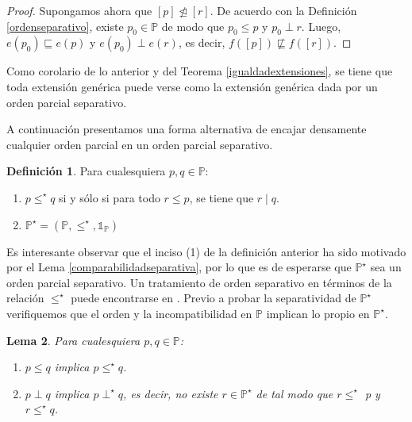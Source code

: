 \documentclass[11pt]{unam_tesis1}
\theoremstyle{MyThmStyle}
\theoremstyle{definition}
\newtheorem{definition}{Definici\'on}[chapter]
\theoremstyle{plain}
\newtheorem{lemma}[definition]{Lema}
\theoremstyle{remark}
\newtheorem*{remark}{Observaci\'on}
\let\leq\leqslant
\begin{document}
\begin{proof}
Supongamos ahora que $[p]\ntrianglelefteq [r]$. De acuerdo con la Definici\'on \ref{ordenseparativo}, existe $p_0\in \mathbb P$ de modo que $p_0\leq p$ y $p_0\perp r$. Luego, $e(p_0)\sqsubseteq e(p)$ y $e(p_0)\perp e(r)$, es decir, $f([p])\not\sqsubseteq f([r])$.
\end{proof}

Como corolario de lo anterior y del Teorema \ref{igualdadextensiones}, se tiene que toda extensi\'on gen\'erica puede verse como la extensi\'on gen\'erica dada por un orden parcial separativo.

A continuaci\'on presentamos una forma alternativa de encajar densamente cualquier orden parcial en un orden parcial separativo.
\newpage
\begin{definition}\label{ordenestrella}
Para cualesquiera $p,q\in \mathbb P$:
\begin{enumerate}
\item $p\leq^\star q$ si y s\'olo si para todo $r\leq p$, se tiene que $r\mid q$.
\item $\mathbb P^{\star}=(\mathbb P,\leq^\star,\mathds 1_{\mathbb P})$
\end{enumerate}

\end{definition}

Es interesante observar que el inciso (1) de la definici\'on anterior ha sido motivado por el Lema  \ref{comparabilidadseparativa}, por lo que es de esperarse que $\mathbb P^\star$ sea un orden parcial separativo. Un tratamiento de orden separativo en t\'erminos de la relaci\'on $\leq^\star$ puede encontrarse en \cite{barto}. Previo a probar la separatividad de $\mathbb P^\star$ verifiquemos que el orden y la incompatibilidad en $\mathbb P$ implican lo propio en $\mathbb P^\star$.

\begin{lemma}\label{implicacionestrella}
Para cualesquiera $p,q\in \mathbb P$:
\begin{enumerate}
\item $p\leq q$ implica $p\leq^\star q$.
\item $p\perp q$ implica $p\perp^\star q$, es decir, no existe $r \in \mathbb P^\star$ de tal modo que $r \leq^\star$ p y $r \leq^\star q$.
\end{enumerate}
\end{lemma}
\end{document}
